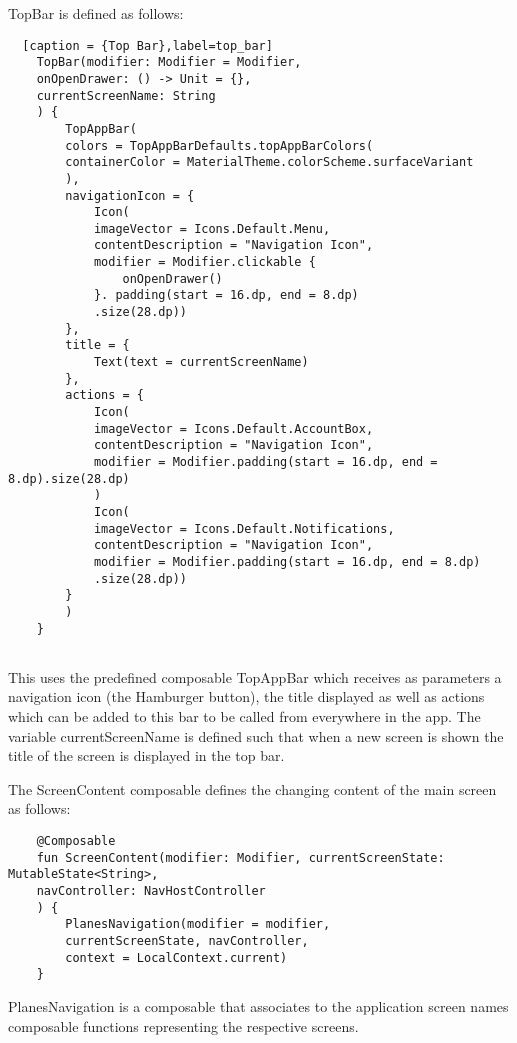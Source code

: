 TopBar is defined as follows:

\begin{lstlisting}  [caption = {Top Bar},label=top_bar]
	TopBar(modifier: Modifier = Modifier,
	onOpenDrawer: () -> Unit = {},
	currentScreenName: String
	) {
		TopAppBar(
		colors = TopAppBarDefaults.topAppBarColors(
		containerColor = MaterialTheme.colorScheme.surfaceVariant
		),
		navigationIcon = {
			Icon(
			imageVector = Icons.Default.Menu,
			contentDescription = "Navigation Icon",
			modifier = Modifier.clickable {
				onOpenDrawer()
			}. padding(start = 16.dp, end = 8.dp)
			.size(28.dp))
		},
		title = {
			Text(text = currentScreenName)
		},
		actions = {
			Icon(
			imageVector = Icons.Default.AccountBox,
			contentDescription = "Navigation Icon",
			modifier = Modifier.padding(start = 16.dp, end = 8.dp).size(28.dp)
			)
			Icon(
			imageVector = Icons.Default.Notifications,
			contentDescription = "Navigation Icon",
			modifier = Modifier.padding(start = 16.dp, end = 8.dp)
			.size(28.dp))
		}
		)
	}
	
\end{lstlisting}

This uses the predefined composable TopAppBar which receives as parameters a navigation icon (the Hamburger button), the title displayed as well as actions which can be added to this bar to be called from everywhere in the app. The variable currentScreenName is defined such that when a new screen is shown the title of the screen is displayed in the top bar.

The ScreenContent composable defines the changing content of the main screen as follows:

\begin{lstlisting}
	@Composable
	fun ScreenContent(modifier: Modifier, currentScreenState: MutableState<String>,
	navController: NavHostController
	) {
		PlanesNavigation(modifier = modifier,
		currentScreenState, navController,
		context = LocalContext.current)
	}
\end{lstlisting}

PlanesNavigation is a composable that associates to the application screen names composable functions representing the respective screens.

